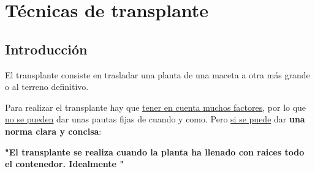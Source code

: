 \documentclass[a4paper,12pt,oneside]{article}
\begin{document}
\section{Técnicas de transplante}
\label{sec:org5d33378}
\subsection{Introducción}
\label{sec:org421459f}
El transplante consiste en trasladar una planta de una maceta a otra más grande
o al terreno definitivo.

Para realizar el transplante hay que \uline{tener en cuenta muchos factores}, por lo
que \uline{no se pueden} dar unas pautas fijas de cuando y como. Pero \uline{si se puede}
dar \textbf{una norma clara y concisa}:
\begin{center}
\textbf{"El transplante se realiza cuando la planta ha llenado con raices todo el
 contenedor. Idealmente "} 
\end{center}
\end{document}
